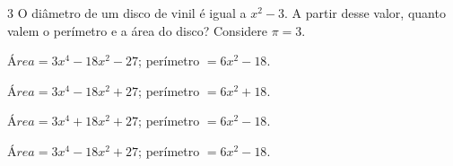 



\num{3} O diâmetro de um disco de vinil é igual a $x^2 - 3$. A partir desse
valor, quanto valem o perímetro e a área do disco? Considere $\pi = 3$.

\begin{escolha}[itemsep=0pt]
\item $Área = 3x^4 - 18x^2 - 27$; perímetro $= 6x^2 - 18$.
\item $Área = 3x^4 - 18x^2 + 27$; perímetro $= 6x^2 + 18$.
\item $Área = 3x^4 + 18x^2 + 27$; perímetro $= 6x^2 - 18$.
\item $Área = 3x^4 - 18x^2 + 27$; perímetro $= 6x^2 - 18$.
\end{escolha}



















